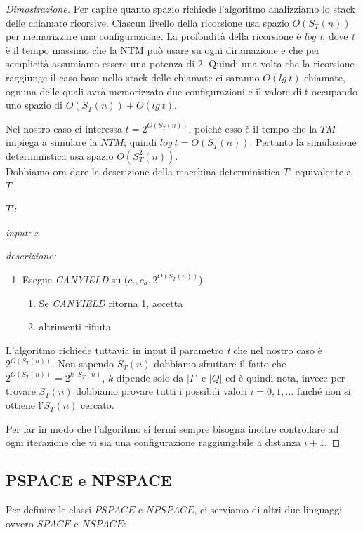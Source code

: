 \begin{proof}[Dimostrazione]
Per capire quanto spazio richiede l'algoritmo analizziamo lo stack delle chiamate ricorsive. Ciascun livello della ricorsione usa spazio \emph{$O(S_{T}(n))$} per memorizzare una configurazione. La profondità della ricorsione è \emph{log t}, dove \emph{t} è il tempo massimo che la NTM può usare su ogni diramazione e che per semplicità assumiamo essere una potenza di 2. Quindi una volta che la ricorsione raggiunge il caso base nello stack delle chiamate ci saranno $O(lg \ t)$ chiamate, ognuna delle quali avrà memorizzato due configurazioni e il valore di t occupando uno spazio di $O(S_T(n)) + O(lg \ t)$.

 Nel nostro caso ci interessa $t=2^{O(S_{T}(n))}$, poiché esso è il tempo che la $TM$ impiega a simulare la $NTM$; quindi $log \ t = O(S_{T}(n))$. Pertanto la simulazione deterministica usa spazio $O(S^2_{T}(n))$.\\
Dobbiamo ora dare la descrizione della macchina deterministica $T'$ equivalente a $T$.

\newpage
$T'$:
\begin{description}
	\item \textit{input: x}  
	\item \textit{descrizione:}
	\begin{enumerate}[label*=\arabic*.]
		\item Esegue \emph{CANYIELD} su ($c_i,c_a,2^{O(S_T(n))}$)
		\begin{enumerate}[label*=\arabic*.]
			\item Se \emph{CANYIELD} ritorna 1, accetta
			\item altrimenti rifiuta
		\end{enumerate}
	\end{enumerate}
\end{description}
L'algoritmo richiede tuttavia in input il parametro \emph{t} che nel nostro caso è $2^{O(S_T(n))}$. Non sapendo $S_T(n)$ dobbiamo sfruttare il fatto che $2^{O(S_T(n))} = 2^{k\cdot S_T(n)}$, $k$ dipende solo da $|\Gamma|$ e $|Q|$ ed è quindi nota, invece per trovare $S_T(n)$  dobbiamo provare tutti i possibili valori $i = 0,1,\dots$ finché non si ottiene l'$S_T(n)$ cercato.

Per far in modo che l'algoritmo si fermi sempre bisogna inoltre controllare ad ogni iterazione che vi sia una configurazione raggiungibile a distanza $i+1$.
\end{proof}

\subsection{PSPACE e NPSPACE}
Per definire le classi $PSPACE$ e $NPSPACE$, ci serviamo di altri due linguaggi ovvero $SPACE$ e $NSPACE$:

